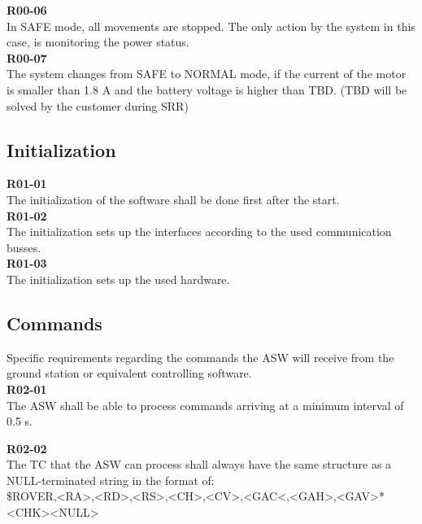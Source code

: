 \textbf{R00-06}\\
In SAFE mode, all movements are stopped. The only action by the system in this case, is monitoring the power status.\\

\textbf{R00-07}\\
The system changes from SAFE to NORMAL mode, if the current of the motor is smaller than 1.8 A and the battery voltage is higher than TBD. (TBD will be solved by the customer during SRR)\\

\subsection{Initialization}

\textbf{R01-01}\\
The initialization of the software shall be done first after the start.\\

\textbf{R01-02}\\
The initialization sets up the interfaces according to the used communication busses.\\

\textbf{R01-03}\\
The initialization sets up the used hardware.

\subsection{Commands}

Specific requirements regarding the commands the ASW will receive from the ground station or equivalent controlling software.\\

\textbf{R02-01}\\
The ASW shall be able to process commands arriving at a minimum interval of 0.5 s.\\


\newpage

\textbf{R02-02}\\
The TC that the ASW can process shall always have the same structure as a NULL-terminated string in the format of:\\

\$ROVER,<RA>,<RD>,<RS>,<CH>,<CV>,<GAC<,<GAH>,<GAV>*<CHK><NULL> \\

